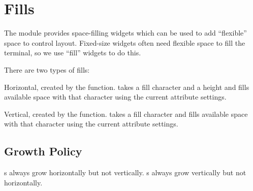 \section{Fills}

The  module provides space-filling widgets which can be used
to add ``flexible'' space to control layout.  Fixed-size widgets often
need flexible space to fill the terminal, so we use ``fill'' widgets
to do this.

There are two types of fills:

\begin{haskellcode}
\item Horizontal, created by the  function.  
  takes a fill character and a height and fills available space with
  that character using the current attribute settings.
\item Vertical, created by the  function.   takes
  a fill character and fills available space with that character using
  the current attribute settings.
\end{haskellcode}

\subsection{Growth Policy}

s always grow horizontally but not vertically.  s
always grow vertically but not horizontally.

